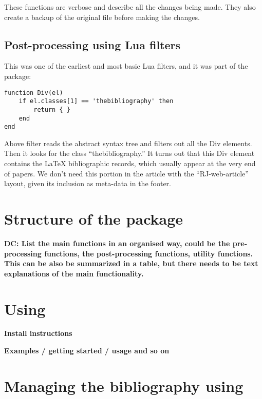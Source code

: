 These functions are verbose and describe all the changes being made. They also create a backup of the original file before making the changes.

\hypertarget{post-processing-using-lua-filters}{%
\subsection{Post-processing using Lua filters}\label{post-processing-using-lua-filters}}

This was one of the earliest and most basic Lua filters, and it was part of the  package:

\begin{verbatim}
function Div(el)
    if el.classes[1] == 'thebibliography' then
        return { }
    end
end
\end{verbatim}

Above filter reads the abstract syntax tree and filters out all the Div elements. Then it looks for the class ``thebibliography.'' It turns out that this Div element contains the LaTeX bibliographic records, which usually appear at the very end
of papers. We don't need this portion in the article with the ``RJ-web-article'' layout, given its inclusion as meta-data in the footer.

\hypertarget{structure-of-the-package}{%
\section{\texorpdfstring{Structure of the  package}{Structure of the  package}}\label{structure-of-the-package}}

\textbf{DC: List the main functions in an organised way, could be the pre-processing functions, the post-processing functions, utility functions. This can be also be summarized in a table, but there needs to be text explanations of the main functionality.}

\hypertarget{using}{%
\section{\texorpdfstring{Using }{Using }}\label{using}}

\textbf{Install instructions}

\textbf{Examples / getting started / usage and so on}

\hypertarget{managing-the-bibliography-using}{%
\section{\texorpdfstring{Managing the bibliography using }{Managing the bibliography using }}\label{managing-the-bibliography-using}}

